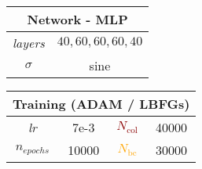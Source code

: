 \documentclass[varwidth=10.5cm,border=2mm]{standalone}
\begin{document}
    \begin{center}
        \begin{table}[htbp]
            \centering
            \begin{tabular}{cc}
                \toprule
                \multicolumn{2}{c}{\textbf{Network - MLP}} \\
                \midrule
                \textit{layers} & $40,60,60,60,40$ \\
                \cmidrule(lr){1-2}
                $\sigma$ & sine \\
                \bottomrule
            \end{tabular}
            \hspace{0.1cm}
            \begin{tabular}{cccc}
                \toprule
                \multicolumn{4}{c}{\textbf{Training} (ADAM / LBFGs)} \\
                \midrule
                \textit{lr} & 7e-3 & \textcolor{darkred}{$N_\text{col}$} & 40000 \\
                \cmidrule(lr){1-2} \cmidrule(lr){3-4}
                $n_{epochs}$ & 10000 & \textcolor{orange}{$N_\text{bc}$} & 30000 \\
                \bottomrule
            \end{tabular}
        \end{table}
    \end{center}
\end{document}
